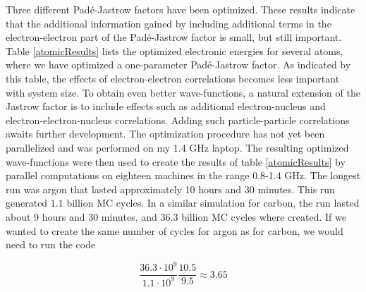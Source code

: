Three different Pad\'{e}-Jastrow factors have been optimized. These
results indicate that the additional information gained by including
additional terms in the electron-electron part of the Pad\'{e}-Jastrow
factor is small, but still important. 
\newline
%
\newline
Table \ref{atomicResults} lists the optimized electronic energies for
several atoms, where we have optimized a one-parameter Pad\'{e}-Jastrow
factor. As indicated by this table, the effects of 
electron-electron correlations becomes less important with
system size. To obtain even better wave-functions, a
natural extension of the Jastrow factor is to include
effects such as additional electron-nucleus and
electron-electron-nucleus correlations. Adding such particle-particle 
correlations awaits further development. 
\newline
%
\newline
The optimization procedure has
not yet been parallelized and was performed on my 1.4 GHz laptop. The
resulting optimized wave-functions were then used to create the
results of table \ref{atomicResults} by parallel computations on
eighteen machines in the range 0.8-1.4 GHz. The longest run was
argon that lasted approximately 10 hours and 30 minutes. This run
generated  $1.1$ billion MC cycles. In a similar simulation for
carbon, the run lasted about 9 hours and 30 minutes, and $36.3$ billion
MC cycles where created. If we wanted to create the same number
of cycles for argon as for carbon, we would need to run the code

\begin{equation*}
  \frac{36.3\cdot10^9}{1.1\cdot10^9} \frac{10.5}{9.5} \approx 3.65
\end{equation*}

